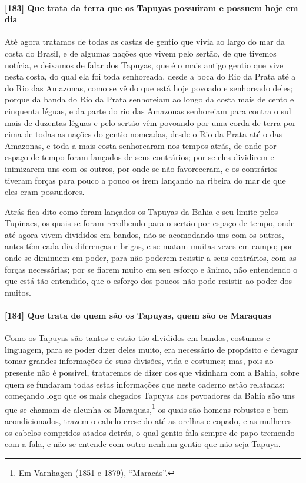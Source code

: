 \paragraph{[183] Que trata da terra que os Tapuyas possuíram e possuem hoje em dia}\quad
Até agora tratamos de todas as castas de gentio que vivia ao largo do mar da costa do
Brasil, e de algumas nações que vivem pelo sertão, de que tivemos notícia, e deixamos de
falar dos Tapuyas, que é o mais antigo gentio que vive nesta costa, do qual ela foi toda
senhoreada, desde a boca do Rio da Prata até a do Rio das Amazonas, como se vê do que está
hoje povoado e senhoreado deles; porque da banda do Rio da Prata senhoreiam ao longo da
costa mais de cento e cinquenta léguas, e da parte do rio das Amazonas senhoreiam para
contra o sul mais de duzentas léguas e pelo sertão vêm povoando por uma corda de terra por
cima de todas as nações do gentio nomeadas, desde o Rio da Prata até o das Amazonas, e
toda a mais costa senhorearam nos tempos atrás, de onde por espaço de tempo foram lançados
de seus contrários; por se eles dividirem e inimizarem uns com os outros, por onde se não
favoreceram, e os contrários tiveram forças para pouco a pouco os irem lançando na ribeira
do mar de que eles eram possuidores.

Atrás fica dito como foram lançados os Tapuyas da Bahia e seu limite pelos Tupinaes, os
quais se foram recolhendo para o sertão por espaço de tempo, onde até agora vivem
divididos em bandos, não se acomodando uns com os outros, antes têm cada dia diferenças e
brigas, e se matam muitas vezes em campo; por onde se diminuem em poder, para não poderem
resistir a seus contrários, com as forças necessárias; por se fiarem muito em seu esforço
e ânimo, não entendendo o que está tão entendido, que o esforço dos poucos não pode
resistir ao poder dos muitos.

\paragraph{[184] Que trata de quem são os Tapuyas, quem são os Maraquas}\quad
Como os Tapuyas são tantos e estão tão divididos em bandos, costumes e linguagem, para se
poder dizer deles muito, era necessário de propósito e devagar tomar grandes informações
de suas divisões, vida e costumes; mas, pois ao presente não é possível, trataremos de
dizer dos que vizinham com a Bahia, sobre quem se fundaram todas estas informações que
neste caderno estão relatadas; começando logo que os mais chegados Tapuyas aos povoadores
da Bahia são uns que se chamam de alcunha os Maraquas,\footnote{ Em Varnhagen (1851 e
1879), ``Maracás''.} os quais são homens robustos e bem acondicionados, trazem o cabelo
crescido até as orelhas e copado, e as mulheres os cabelos compridos atados detrás, o qual
gentio fala sempre de papo tremendo com a fala, e não se entende com outro nenhum gentio
que não seja Tapuya.

